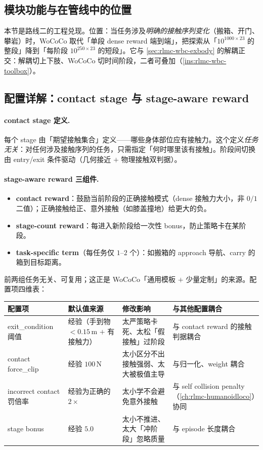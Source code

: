 \subsection{模块功能与在管线中的位置}
本节是路线二的工程兑现。位置：当任务涉及\emph{明确的接触序列变化}（搬箱、开门、攀岩）时，WoCoCo 取代「单段 dense reward 端到端」，把探索从「$10^{1000\times 23}$ 的整段」降到「每阶段 $10^{250\times 23}$ 的短段」。它与 \cref{sec:rlmc-wbc-exbody} 的解耦正交：解耦切上下肢、WoCoCo 切时间阶段，二者可叠加（\cref{ins:rlmc-wbc-toolbox}）。

\subsection{配置详解：contact stage 与 stage-aware reward}

\paragraph{contact stage 定义.}
每个 stage 由「期望接触集合」定义——哪些身体部位应有接触力。这个定义\emph{任务无关}：对任何涉及接触序列的任务，只需指定「何时哪里该有接触」。阶段间切换由 entry/exit 条件驱动（几何接近 $+$ 物理接触双判据）。

\paragraph{stage-aware reward 三组件.}
\begin{itemize}
  \item \textbf{contact reward}：鼓励当前阶段的正确接触模式（dense 接触力大小，非 $0/1$ 二值）；正确接触给正、意外接触（如膝盖撞地）给更大的负。
  \item \textbf{stage-count reward}：每进入新阶段给一次性 bonus，防止策略卡在某阶段。
  \item \textbf{task-specific term}（每任务仅 $1$--$2$ 个）：如搬箱的 approach 导航、carry 的箱到目标距离。
\end{itemize}
前两组任务无关、可复用；这正是 WoCoCo「通用模板 $+$ 少量定制」的来源。配置项四维表：

\begin{center}
\small
\begin{tabular}{p{2.6cm}p{2.8cm}p{3.0cm}p{3.0cm}}
\hline
配置项 & 默认值来源 & 修改影响 & 与其他配置耦合 \\
\hline
exit\_condition 阈值 & 经验（手到物 $<0.15$\,m $+$ 有接触力） & 太严策略卡死、太松「假接触」过阶段 & 与 contact reward 的接触判据耦合 \\
contact force\_clip & 经验 $100$\,N & 太小区分不出接触强弱、太大被极值主导 & 与归一化、weight 耦合 \\
incorrect contact 罚倍率 & 经验为正确的 $2\times$ & 太小学不会避免意外接触 & 与 self collision penalty（\cref{ch:rlmc-humanoidloco}）协同 \\
stage bonus & 经验 $5.0$ & 太小不推进、太大「冲阶段」忽略质量 & 与 episode 长度耦合 \\
\hline
\end{tabular}
\end{center}

